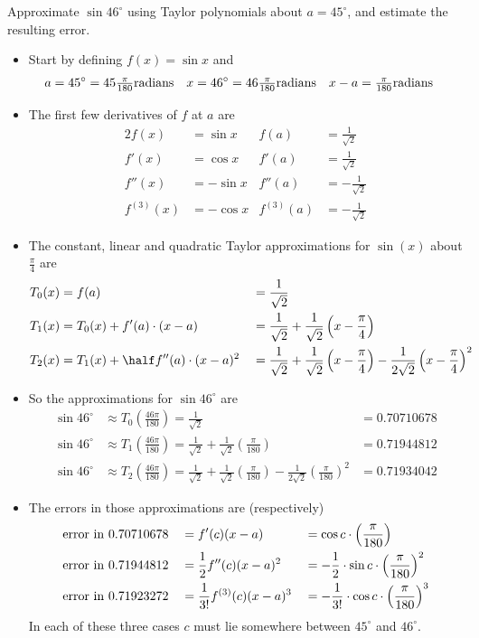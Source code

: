 \begin{eg}\label{eg:taylorErrorSin}
Approximate $\sin 46^\circ$ using Taylor polynomials about
$a=45^\circ$, and estimate the resulting error.

\soln
\begin{itemize}
 \item Start by defining $f(x) = \sin x$ and
\begin{align*}
a&=45^\circ=45\tfrac{\pi}{180} {\rm radians}&
x&=46^\circ=46\tfrac{\pi}{180} {\rm radians}&
x-a&=\tfrac{\pi}{180} {\rm radians}
\end{align*}
\item The first few derivatives of $f$ at $a$ are
\begin{alignat*}{2}
f(x)&=\sin x
&f(a)&=\frac{1}{\sqrt{2}}\\
f'(x)&=\cos x &
f'(a)&=\frac{1}{\sqrt{2}}\\
f''(x)&=-\sin x &
f''(a)&=-\frac{1}{\sqrt{2}}\\
f^{(3)}(x)&=-\cos x &
f^{(3)}(a)&=-\frac{1}{\sqrt{2}}
\end{alignat*}
\item
The constant, linear and quadratic Taylor approximations for $\sin(x)$ about
$\frac{\pi}{4}$ are
\begin{alignat*}{4}
  T_0(x) &= f(a)
    &&= \frac{1}{\sqrt{2}} \\
  T_1(x) &= T_0(x) + f'(a) \cdot(x-a)
    &&= \frac{1}{\sqrt{2}} + \frac{1}{\sqrt{2}}\left(x - \frac{\pi}{4} \right)\\
  T_2(x) &= T_1(x) + \half f''(a) \cdot(x-a)^2
    &&=  \frac{1}{\sqrt{2}} + \frac{1}{\sqrt{2}}\left(x - \frac{\pi}{4} \right)
  - \frac{1}{2\sqrt{2}}\left(x - \frac{\pi}{4} \right)^2
\end{alignat*}
\item So the approximations for $\sin 46^\circ$ are
\begin{align*}
\sin46^\circ &\approx T_0\left(\frac{46\pi}{180}\right) = \frac{1}{\sqrt{2}} &
=0.70710678\\
\sin46^\circ &\approx T_1\left(\frac{46\pi}{180}\right)
= \frac{1}{\sqrt{2}} + \frac{1}{\sqrt{2}} \left(\frac{\pi}{180}\right)
&=0.71944812\\
\sin46^\circ&\approx T_2\left(\frac{46\pi}{180}\right)
= \frac{1}{\sqrt{2}} + \frac{1}{\sqrt{2}} \left(\frac{\pi}{180}\right)
- \frac{1}{2\sqrt{2}}\left(\frac{\pi}{180}\right)^2
 &=0.71934042
\end{align*}
\item The errors in those approximations are (respectively)
\begin{alignat*}{3}
&{\rm error\ in\ 0.70710678}&
     &=f'(c)(x-a)&
     &=\cos c \cdot \left(\frac{\pi}{180}\right)\\
%
&{\rm error\ in\ 0.71944812}&
   &=\frac{1}{2} f''(c)(x-a)^2&
   &=-\frac{1}{2} \cdot \sin c\cdot \left(\frac{\pi}{180}\right)^2\\
&{\rm error\ in\ 0.71923272}&
   &=\frac{1}{3!}f^{(3)}(c)(x-a)^3&
   &=-\frac{1}{3!}\cdot \cos c \cdot \left(\frac{\pi}{180}\right)^3
\end{alignat*}
In each of these three cases $c$ must lie somewhere between $45^\circ$ and
$46^\circ$.


\end{itemize}
\end{eg}
